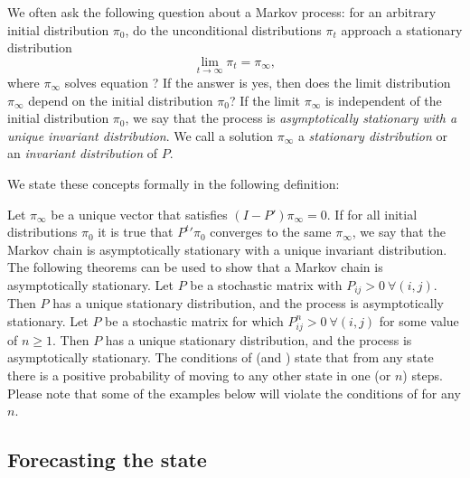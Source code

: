    We often ask the following question
about a    Markov process: for an arbitrary initial distribution
$\pi_0$, do the unconditional distributions
$\pi_t$ approach a stationary distribution
$$ \lim_{t \to \infty} \pi_t = \pi_\infty ,$$
where $\pi_\infty$ solves equation
 ?  If the answer is yes, then does the
limit distribution $\pi_\infty$ depend on the initial distribution
$\pi_0$?  If the limit $\pi_\infty$ is independent of the
initial distribution $\pi_0$, we say that the process is
{\it asymptotically stationary with a unique invariant distribution}.
We call a solution $\pi_\infty$ a {\it stationary
distribution\/} or an {\it invariant distribution\/} of $P$.

 

  We state these concepts formally in the following definition:

\medskip%
  Let $\pi_\infty$ be a unique vector that
satisfies
$(I-P') \pi_\infty=0.$  If for all initial distributions
$\pi_0$ it is true that $P^t{'} \pi_0$ converges to
the same $\pi_\infty$, we say that the Markov chain
is asymptotically stationary with a unique invariant distribution.
\enddefinition
\medskip
  The following theorems can be used to show
that a Markov chain is asymptotically stationary.
\medskip
  Let $P$ be a stochastic
matrix with $P_{ij} > 0 \ \forall (i,j)$.  Then $P$ has
a unique stationary distribution, and the
process is asymptotically stationary.
\endtheorem
\medskip
  Let $P$ be a stochastic matrix
for which $P^n_{ij} > 0 \ \forall (i,j)$ for some
value of $n \geq 1$.  Then $P$ has a unique stationary
distribution, and the process is asymptotically stationary.
\endtheorem
\medskip
\noindent The conditions of  (and ) state that from any
state there is a positive probability of moving to any other state
in one (or $n$) steps. Please note that some of the examples below will violate
the conditions of  for any $n$.


\subsection{Forecasting the state}


